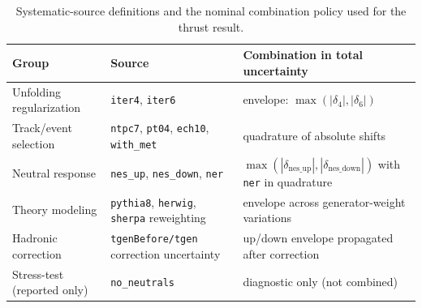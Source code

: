 \begin{table}[t!]
\centering
\scriptsize
\begin{tabularx}{0.98\textwidth}{p{}p{}X}
\hline
Group & Source & Combination in total uncertainty \\
\hline
Unfolding regularization & \texttt{iter4}, \texttt{iter6} & envelope: $\max(|\delta_{4}|,|\delta_{6}|)$ \\
Track/event selection & \texttt{ntpc7}, \texttt{pt04}, \texttt{ech10}, \texttt{with\_met} & quadrature of absolute shifts \\
Neutral response & \texttt{nes\_up}, \texttt{nes\_down}, \texttt{ner} & $\max(|\delta_{\mathrm{nes\_up}}|,|\delta_{\mathrm{nes\_down}}|)$ with \texttt{ner} in quadrature \\
Theory modeling & \texttt{pythia8}, \texttt{herwig}, \texttt{sherpa} reweighting & envelope across generator-weight variations \\
Hadronic correction & \texttt{tgenBefore/tgen} correction uncertainty & up/down envelope propagated after correction \\
Stress-test (reported only) & \texttt{no\_neutrals} & diagnostic only (not combined) \\
\hline
\end{tabularx}
\normalsize
\caption{Systematic-source definitions and the nominal combination policy used for the thrust result.}
\label{tab:systematics_definition}
\end{table}

